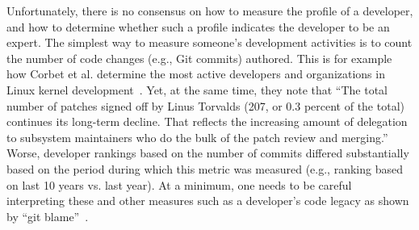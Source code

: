 Unfortunately, there is no consensus on how to measure the profile of a developer, and how to determine whether such a profile indicates the developer to be an expert. The simplest way to measure someone's development activities is to count the number of code changes (e.g., Git commits) authored. This is for example how Corbet et al. determine the most active developers and organizations in Linux kernel development~\citep{corbet17}. Yet, at the same time, they note that ``The total number of patches signed off by Linus Torvalds (207, or 0.3 percent of the total) continues its long-term decline. That reflects the increasing amount of delegation to subsystem maintainers who do the bulk of the patch review and merging.'' Worse, developer rankings based on the number of commits differed substantially based on the period during which this metric was measured (e.g., ranking based on last 10 years vs. last year). At a minimum, one needs to be careful interpreting these and other measures such as a developer's code legacy as shown by ``git blame''~\citep{Bhattacharya, mockus02, McDonald, Fritz-2007}.%

%
%
%

